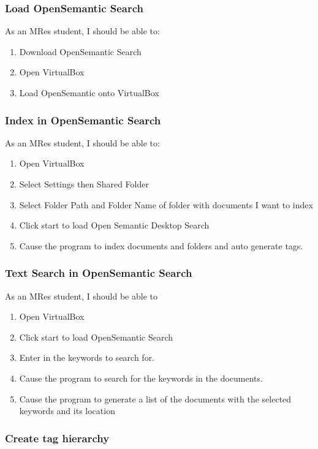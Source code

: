 \documentclass{article}
\begin{document}
\subsubsection*{Load OpenSemantic Search}

As an MRes student, I should be able to:
\begin{enumerate}
\item Download OpenSemantic Search
\item Open VirtualBox
\item Load OpenSemantic onto VirtualBox
\end{enumerate}

\subsubsection*{Index in OpenSemantic Search}

As an MRes student, I should be able to:
\begin{enumerate}
\item Open VirtualBox
\item Select Settings then Shared Folder
\item Select Folder Path and Folder Name of folder with documents I want to index
\item Click start to load Open Semantic Desktop Search
\item Cause the program to index documents and folders and auto generate tags.
\end{enumerate}

\subsubsection*{Text Search in OpenSemantic Search}

As an MRes student, I should be able to
\begin{enumerate}
\item Open VirtualBox
\item Click start to load OpenSemantic Search
\item Enter in the keywords to search for.
\item Cause the program to search for the keywords in the documents.
\item Cause the program to generate a list of the documents with the selected keywords and its location
\end{enumerate}

\subsubsection*{Create tag hierarchy}
\end{document}
